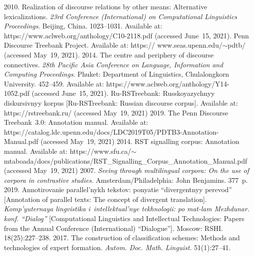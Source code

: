 \begin{multicols}{2}
{{\begin{thebibliography}{99}
 2010. Realization of discourse relations by other 
means: Alternative lexicalizations. \textit{23rd Conference (International) on Computational 
Linguistics Proceedings}. Beijing, China. 1023--1031.
Available at: {\sf https://www.aclweb.org/anthology/C10-2118.pdf}
(accessed June~15, 2021).
Penn Discourse Treebank Project. Available at: {\sf https:// www.seas.upenn.edu/$\sim$pdtb/} 
(accessed May~19, 2021).
 2014. The centre and 
periphery of discourse connectives. \textit{28th Pacific Asia Conference on Language, 
Information and Computing Proceedings}. Phuket: Department of Linguistics, Chulalongkorn 
University. 452--459. 
Available at: {\sf https://www.aclweb.org/\linebreak anthology/Y14-1052.pdf}
(accessed June~15, 2021).
Ru-RSTreebank: Russkoyazychnyy diskursivnyy korpus [Ru-RSTreebank: Russian discourse 
corpus]. Available at: {\sf https://rstreebank.ru/} (accessed May~19, 2021)
 2019. The Penn Discourse Treebank~3.0: 
Annotation manual. Available at: {\sf  
https://catalog.ldc.upenn.edu/docs/\linebreak LDC2019T05/PDTB3-Annotation-Manual.pdf} (accessed 
May~19, 2021)
 2014. RST signalling corpus: Annotation manual. Available 
at:  {\sf https://www.\linebreak sfu.ca/$\sim$mtaboada/docs/publications/RST\_Signalling\_\linebreak Corpus\_Annotation\_Manual.pdf} 
(accessed May~19, 2021)
 2007. \textit{Seeing through multilingual corpora: On the use of corpora in 
contrastive studies}. Amsterdam/Philadelphia: John Benjamins. 377~p.
 2019. Annotirovanie parallel'nykh tekstov: ponyatie ``divergentnyy 
perevod'' [Annotation of parallel texts: The concept of divergent translation]. 
\textit{Komp'yuternaya lingvistika i~intellektual'nye tekhnologii: po mat-lam Mezhdunar. konf. 
``Dialog''} [Computational Linguistics and Intellectual Technologies: Papers from the Annual 
Conference (International) ``Dialogue'']. Moscow: RSHI. 18(25):227--238.
 2017. The construction of classification schemes: 
Methods and technologies of expert formation. \textit{Autom. Doc. Math. 
Linguist.} 51(1):27--41.
\end{thebibliography}

 }
 }

\end{multicols}

